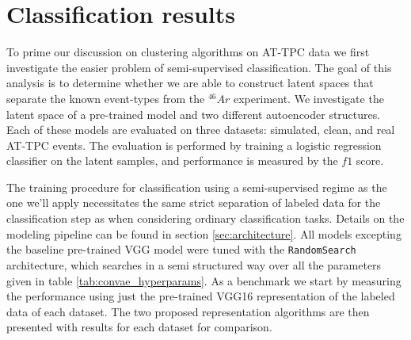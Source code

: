 \chapter{Classification results}\label{chap:classification}

To prime our discussion on clustering algorithms on AT-TPC data we first investigate the easier problem of semi-supervised classification. The goal of this analysis is to determine whether we are able to construct latent spaces that separate the known event-types from the ${}^{46}Ar$ experiment. We investigate the latent space of a pre-trained model and two different autoencoder structures. Each of these models are evaluated on three datasets: simulated, clean, and real AT-TPC events. The evaluation is performed by training a logistic regression classifier on the latent samples, and performance is measured by the $f1$ score. 

The training procedure for classification using a semi-supervised regime as the one we'll apply necessitates the same strict separation of labeled data for the classification step as when considering ordinary classification tasks. Details on the modeling pipeline can be found in section \ref{sec:architecture}. All models excepting the baseline pre-trained VGG model were tuned with the \lstinline{RandomSearch} architecture, which searches in a semi structured way over all the parameters given in table \ref{tab:convae_hyperparams}. As a benchmark we start by measuring the performance using just the pre-trained VGG16 representation of the labeled data of each dataset. The two proposed representation algorithms are then presented with results for each dataset for comparison. 
